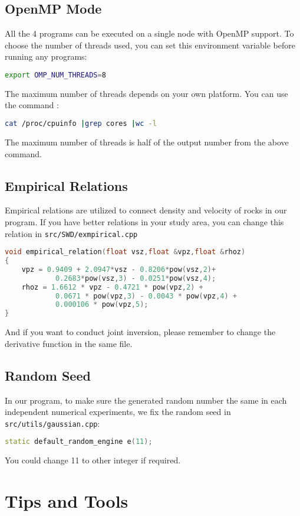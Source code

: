 \documentclass[UTF8]{article}
\begin{document}
\subsection{OpenMP Mode}
All the 4 programs can be executed on a single node with OpenMP support. To choose the number of threads used, you can set this environment variable before running any programs:
\begin{lstlisting}[language=bash]
export OMP_NUM_THREADS=8
\end{lstlisting}
The maximum number of threads depends on your own platform. You can use the command :
\begin{lstlisting}[language=bash]
cat /proc/cpuinfo |grep cores |wc -l
\end{lstlisting}
The maximum number of threads is half of the output number from the above command. 

\subsection{Empirical Relations}
Empirical relations are utilized to connect density and 
velocity of rocks in our program. If you have better relations 
in your study area, you can change this relation 
in \verb!src/SWD/exmpirical.cpp! 
\begin{lstlisting}[language=c++]
void empirical_relation(float vsz,float &vpz,float &rhoz)
{
    vpz = 0.9409 + 2.0947*vsz - 0.8206*pow(vsz,2)+ 
            0.2683*pow(vsz,3) - 0.0251*pow(vsz,4);
    rhoz = 1.6612 * vpz - 0.4721 * pow(vpz,2) + 
            0.0671 * pow(vpz,3) - 0.0043 * pow(vpz,4) + 
            0.000106 * pow(vpz,5);
}
\end{lstlisting}
And if you want to conduct joint inversion, please remember to
change the derivative function in the same file.

\subsection{Random Seed}
In our program, to make sure the generated random number the same
in each independent numerical experiments, we fix the random seed
in \texttt{src/utils/gaussian.cpp}:
\begin{lstlisting}[language=c++]
static default_random_engine e(11);
\end{lstlisting}
You could change 11 to other integer if required.

\section{Tips and Tools}
\end{document}
